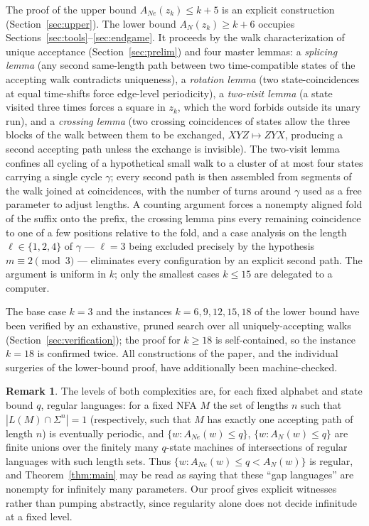 \documentclass[11pt]{article}
\theoremstyle{definition}
\newtheorem{remark}[theorem]{Remark}
\newcommand{\AN}{A_N}
\newcommand{\ANe}{A_{Ne}}
\begin{document}
The proof of the upper bound $\ANe(z_k)\le k+5$ is an explicit construction
(Section~\ref{sec:upper}). The lower bound $\AN(z_k)\ge k+6$ occupies
Sections~\ref{sec:tools}--\ref{sec:endgame}. It proceeds by the walk
characterization of unique acceptance (Section~\ref{sec:prelim}) and four
master lemmas: a \emph{splicing lemma} (any second same-length path between
two time-compatible states of the accepting walk contradicts uniqueness), a
\emph{rotation lemma} (two state-coincidences at equal time-shifts force
edge-level periodicity), a \emph{two-visit lemma} (a state visited three
times forces a square in $z_k$, which the word forbids outside its unary run),
and a \emph{crossing lemma} (two crossing coincidences of states allow the
three blocks of the walk between them to be exchanged, $XYZ\mapsto ZYX$,
producing a second accepting path unless the exchange is invisible).
The two-visit lemma confines all cycling of a hypothetical small walk to a
cluster of at most four states carrying a single cycle $\gamma$; every
second path is then assembled from segments of the walk joined at
coincidences, with the number of turns around $\gamma$ used as a free
parameter to adjust lengths. A counting argument forces a nonempty aligned
fold of the suffix onto the prefix, the crossing lemma pins every remaining
coincidence to one of a few positions relative to the fold, and a case
analysis on the length $\ell\in\{1,2,4\}$ of $\gamma$ --- $\ell=3$ being
excluded precisely by the hypothesis $m\equiv2\pmod 3$ --- eliminates every
configuration by an explicit second path. The argument is uniform in $k$;
only the smallest cases $k\le15$ are delegated to a computer.

The base case $k=3$ and the instances $k=6,9,12,15,18$ of the lower bound
have been verified by an exhaustive, pruned search over all
uniquely-accepting walks (Section~\ref{sec:verification}); the proof for
$k\ge18$ is self-contained, so the instance $k=18$ is confirmed twice.
All constructions of the paper, and the individual surgeries
of the lower-bound proof, have additionally been machine-checked.

\begin{remark}
The levels of both complexities are, for each fixed alphabet and state bound
$q$, regular languages: for a fixed NFA $M$ the set of lengths $n$ such that
$|L(M)\cap\Sigma^n|=1$ (respectively, such that $M$ has exactly one accepting
path of length $n$) is eventually periodic, and
$\{w:\ANe(w)\le q\}$, $\{w:\AN(w)\le q\}$ are finite unions over the finitely
many $q$-state machines of intersections of regular languages with such length
sets. Thus $\{w : \ANe(w)\le q<\AN(w)\}$ is regular, and
Theorem~\ref{thm:main} may be read as saying that these ``gap languages'' are
nonempty for infinitely many parameters. Our proof gives explicit witnesses
rather than pumping abstractly, since regularity alone does not decide
infinitude at a fixed level.
\end{remark}
\end{document}
